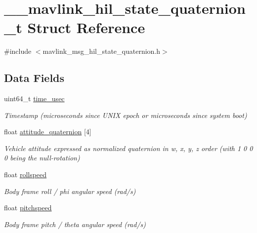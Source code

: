 \hypertarget{struct____mavlink__hil__state__quaternion__t}{\section{\+\_\+\+\_\+mavlink\+\_\+hil\+\_\+state\+\_\+quaternion\+\_\+t Struct Reference}
\label{struct____mavlink__hil__state__quaternion__t}
}


{\ttfamily \#include $<$mavlink\+\_\+msg\+\_\+hil\+\_\+state\+\_\+quaternion.\+h$>$}

\subsection*{Data Fields}
\begin{DoxyCompactItemize}
\item 
uint64\+\_\+t \hyperlink{struct____mavlink__hil__state__quaternion__t_a15c7dccf96d2c5087b171d388dd775d8}{time\+\_\+usec}
\begin{DoxyCompactList}\small\item\em Timestamp (microseconds since U\+N\+I\+X epoch or microseconds since system boot) \end{DoxyCompactList}\item 
float \hyperlink{struct____mavlink__hil__state__quaternion__t_a3abb35174edc949c96d493a40a0c0ff2}{attitude\+\_\+quaternion} \mbox{[}4\mbox{]}
\begin{DoxyCompactList}\small\item\em Vehicle attitude expressed as normalized quaternion in w, x, y, z order (with 1 0 0 0 being the null-\/rotation) \end{DoxyCompactList}\item 
float \hyperlink{struct____mavlink__hil__state__quaternion__t_a83042286abfe3545cabe2d4e5a087f12}{rollspeed}
\begin{DoxyCompactList}\small\item\em Body frame roll / phi angular speed (rad/s) \end{DoxyCompactList}\item 
float \hyperlink{struct____mavlink__hil__state__quaternion__t_a68900f55507fd4fb1dfcf1687fb292ed}{pitchspeed}
\begin{DoxyCompactList}\small\item\em Body frame pitch / theta angular speed (rad/s) \end{DoxyCompactList}\item 

\end{DoxyCompactItemize}
